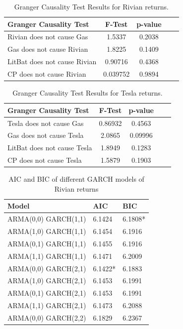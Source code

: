 \documentclass[a4paper,12pt]{article}
\begin{document}
\begin{table}[!h]
\centering
\begin{tabular}{lcccc}
\hline
Granger Causality Test & F-Test & p-value \\
\hline
Rivian does not cause Gas & 1.5337 & 0.2038 \\
Gas does not cause Rivian & 1.8225 & 0.1409 \\
LitBat does not cause Rivian & 0.90716 & 0.4368 \\
CP does not cause Rivian  & 0.039752 & 0.9894 \\
\hline
\end{tabular}
\caption{Granger Causality Test Results for Rivian returns.}
\label{tab:granger_rivian}
\end{table}

\begin{table}[!h]
\centering
\begin{tabular}{lcccc}
\hline
Granger Causality Test & F-Test &  p-value \\
\hline
Tesla does not cause Gas & 0.86932 &  0.4563 \\
Gas does not cause Tesla & 2.0865 &  0.09996 \\
LitBat does not cause Tesla & 1.8949 &  0.1283 \\
CP does not cause Tesla  & 1.5879 &  0.1903 \\
\hline
\end{tabular}
\caption{Granger Causality Test Results for Tesla returns.}
\label{tab:granger_tesla}
\end{table}


\begin{table}[!h]
    \centering
    \begin{tabular}{lll}
    \hline
        Model & AIC & BIC \\ \hline
        ARMA(0,0) GARCH(1,1) & 6.1424 & 6.1808* \\
        ARMA(1,0) GARCH(1,1) & 6.1454 & 6.1916 \\
        ARMA(0,1) GARCH(1,1) & 6.1455 & 6.1916 \\
        ARMA(1,1) GARCH(1,1) & 6.1471 & 6.2009 \\
        ARMA(0,0) GARCH(2,1) & 6.1422* & 6.1883 \\
        ARMA(1,0) GARCH(2,1) & 6.1453 & 6.1991 \\
        ARMA(0,1) GARCH(2,1) & 6.1453 & 6.1991 \\
        ARMA(1,1) GARCH(2,1) & 6.1473 & 6.2088 \\
        ARMA(0,0) GARCH(2,2) & 6.1829 & 6.2367 \\
        \hline
    \end{tabular}
    \caption{AIC and BIC of different GARCH models of Rivian returns}
\end{table}
\end{document}
